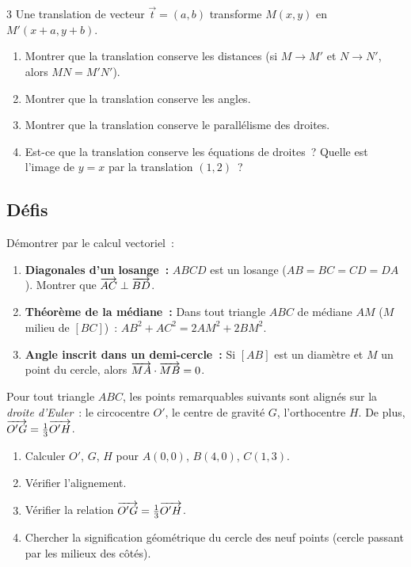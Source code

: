 \begin{probleme}{3}
Une translation de vecteur $\vec{t}=(a,b)$ transforme $M(x,y)$ en $M'(x+a,y+b)$.
\begin{enumerate}
  \item Montrer que la translation conserve les distances (si $M\to M'$
        et $N\to N'$, alors $MN=M'N'$).
  \item Montrer que la translation conserve les angles.
  \item Montrer que la translation conserve le parall\'elisme des droites.
  \item Est-ce que la translation conserve les \'equations de droites~?
        Quelle est l'image de $y=x$ par la translation $(1,2)$~?
\end{enumerate}
\end{probleme}

\subsection*{D\'efis}

\begin{challenge}
D\'emontrer par le calcul vectoriel~:
\begin{enumerate}
  \item \textbf{Diagonales d'un losange~:} $ABCD$ est un losange
        ($AB=BC=CD=DA$). Montrer que $\overrightarrow{AC}\perp\overrightarrow{BD}$.
  \item \textbf{Th\'eor\`eme de la m\'ediane~:} Dans tout triangle $ABC$
        de m\'ediane $AM$ ($M$ milieu de $[BC]$)~:
        $AB^2+AC^2 = 2AM^2+2BM^2$.
  \item \textbf{Angle inscrit dans un demi-cercle~:}
        Si $[AB]$ est un diam\`etre et $M$ un point du cercle,
        alors $\overrightarrow{MA}\cdot\overrightarrow{MB}=0$.
\end{enumerate}
\end{challenge}

\begin{challenge}
Pour tout triangle $ABC$, les points remarquables suivants sont align\'es
sur la \emph{droite d'Euler}~: le circocentre $O'$, le centre de gravité $G$, l'orthocentre $H$.
De plus, $\overrightarrow{O'G} = \frac{1}{3}\overrightarrow{O'H}$.
\begin{enumerate}
  \item Calculer $O'$, $G$, $H$ pour $A(0,0)$, $B(4,0)$, $C(1,3)$.
  \item V\'erifier l'alignement.
  \item V\'erifier la relation $\overrightarrow{O'G} = \frac{1}{3}\overrightarrow{O'H}$.
  \item Chercher la signification g\'eom\'etrique du cercle des neuf points
        (cercle passant par les milieux des c\^ot\'es).
\end{enumerate}
\end{challenge}

